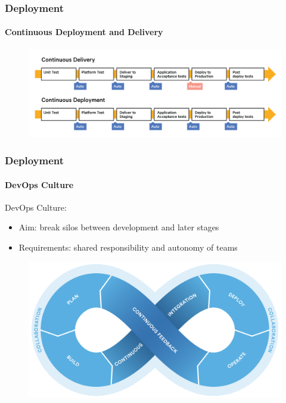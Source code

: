 \documentclass{beamer}
\begin{document}
\begin{frame}
	\frametitle{Deployment}
	\framesubtitle{Continuous Deployment and Delivery}
	\begin{figure}
		\begin{center}
			\includegraphics[scale=0.5]{delivery}
			\caption{\cite{cont_delivery}}
		\end{center}
	\end{figure}
\end{frame}

\begin{frame}
	\frametitle{Deployment}
	\framesubtitle{DevOps Culture}

DevOps Culture:
	\begin{itemize}
		\item Aim: break silos between development and later stages 
		\item Requirements: shared responsibility and autonomy of teams
	\end{itemize}
	\begin{figure}
		\begin{center}
 			\includegraphics[scale=0.12]{devopsloop}
			\caption{\cite{devops}}
		\end{center}
	\end{figure}

\end{frame}
\end{document}
